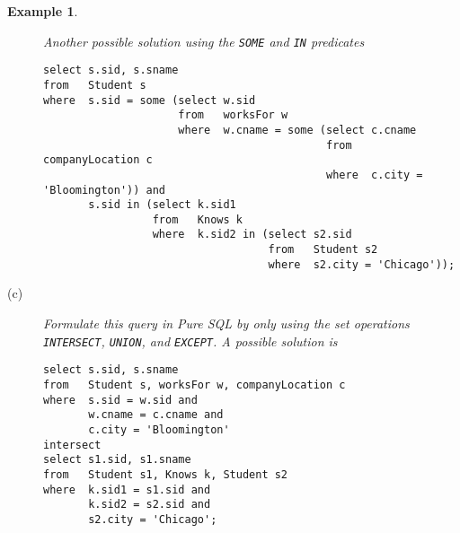 \documentclass[11pt]{article}
\newtheorem{example}{Example}
\begin{document}
\begin{example}
\begin{description}
Another possible solution using the {\tt SOME} and {\tt IN} predicates
{\footnotesize
\begin{verbatim}
select s.sid, s.sname
from   Student s
where  s.sid = some (select w.sid
                     from   worksFor w
                     where  w.cname = some (select c.cname
                                            from   companyLocation c
                                            where  c.city = 'Bloomington')) and
       s.sid in (select k.sid1
                 from   Knows k
                 where  k.sid2 in (select s2.sid
                                   from   Student s2
                                   where  s2.city = 'Chicago'));
\end{verbatim}
}

\item[(c)]   Formulate this query in Pure SQL by only using the set operations {\tt INTERSECT}, {\tt UNION}, and {\tt EXCEPT}.
A possible solution is
{\footnotesize
\begin{verbatim}
select s.sid, s.sname
from   Student s, worksFor w, companyLocation c
where  s.sid = w.sid and
       w.cname = c.cname and
       c.city = 'Bloomington'
intersect
select s1.sid, s1.sname
from   Student s1, Knows k, Student s2
where  k.sid1 = s1.sid and
       k.sid2 = s2.sid and
       s2.city = 'Chicago';
\end{verbatim}}

\end{description}
\end{example}
\end{document}
